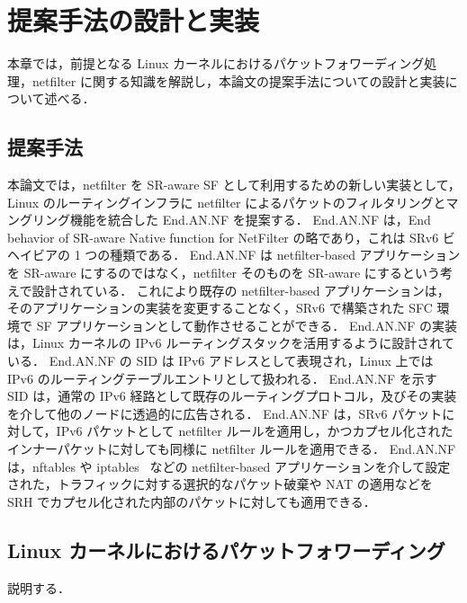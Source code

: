 \chapter{提案手法の設計と実装}
\label{chap:design_and_impl}
本章では，前提となる Linux カーネルにおけるパケットフォワーディング処理，netfilter に関する知識を解説し，本論文の提案手法についての設計と実装について述べる．

\section{提案手法}
\label{section:proposal-method}
本論文では，netfilter を SR-aware SF として利用するための新しい実装として，Linux のルーティングインフラに netfilter によるパケットのフィルタリングとマングリング機能を統合した End.AN.NF を提案する．
End.AN.NF は，End behavior of SR-aware Native function for NetFilter の略であり，これは SRv6 ビヘイビアの 1 つの種類である．
End.AN.NF は netfilter-based アプリケーションを SR-aware にするのではなく，netfilter そのものを SR-aware にするという考えで設計されている．
これにより既存の netfilter-based アプリケーションは，そのアプリケーションの実装を変更することなく，SRv6 で構築された SFC 環境で SF アプリケーションとして動作させることができる．
End.AN.NF の実装は，Linux カーネルの IPv6 ルーティングスタックを活用するように設計されている．
End.AN.NF の SID は IPv6 アドレスとして表現され，Linux 上では IPv6 のルーティングテーブルエントリとして扱われる．
End.AN.NF を示す SID は，通常の IPv6 経路として既存のルーティングプロトコル，及びその実装を介して他のノードに透過的に広告される．
End.AN.NF は，SRv6 パケットに対して，IPv6 パケットとして netfilter ルールを適用し，かつカプセル化されたインナーパケットに対しても同様に netfilter ルールを適用できる．
End.AN.NF は，nftables\cite{nftables} や iptables~\cite{iptables} などの netfilter-based アプリケーションを介して設定された，トラフィックに対する選択的なパケット破棄や NAT の適用などを SRH でカプセル化された内部のパケットに対しても適用できる．

\section{Linux カーネルにおけるパケットフォワーディング}
\label{section:linux-packet-forwarding}
説明する．

